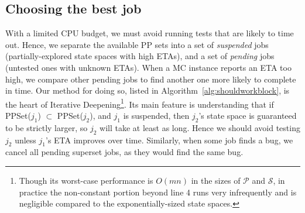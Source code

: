 \subsection{Choosing the best job}

\newcommand\PendingJobs{\ensuremath{\mathcal{P}}}
\newcommand\SuspendedJobs{\ensuremath{\mathcal{S}}}
\newcommand\GetETA[1]{ETA(#1)}
\newcommand\GetPPSet[1]{PPSet(#1)}
With a limited CPU budget, we must avoid running tests that are likely to time out.
Hence, we separate the available PP sets into a set of {\em suspended} jobs (partially-explored state spaces with high ETAs),
and a set of {\em pending} jobs (untested ones with unknown ETAs).
When a MC instance reports an ETA too high,
we compare other pending jobs to find another one more likely to complete in time.
%
Our method for doing so, listed in Algorithm~\ref{alg:shouldworkblock}, is the heart of Iterative Deepening\footnote{
Though its worst-case performance is $O(mn)$ in the
sizes of $\mathcal{P}$ and $\mathcal{S}$,
in practice the non-constant portion beyond line 4 runs very infrequently
and is negligible compared to the exponentially-sized state spaces.}.
Its main feature is understanding that if \GetPPSet{$j_1$} $\subset$ \GetPPSet{$j_2$},
and $j_1$ is suspended,
then $j_2$'s state space is guaranteed to be strictly larger, so $j_2$ will take at least as long.
Hence we should avoid testing $j_2$ unless $j_1$'s ETA improves over time.
Similarly, when some job finds a bug, we cancel all pending superset jobs, as they would find the same bug.

